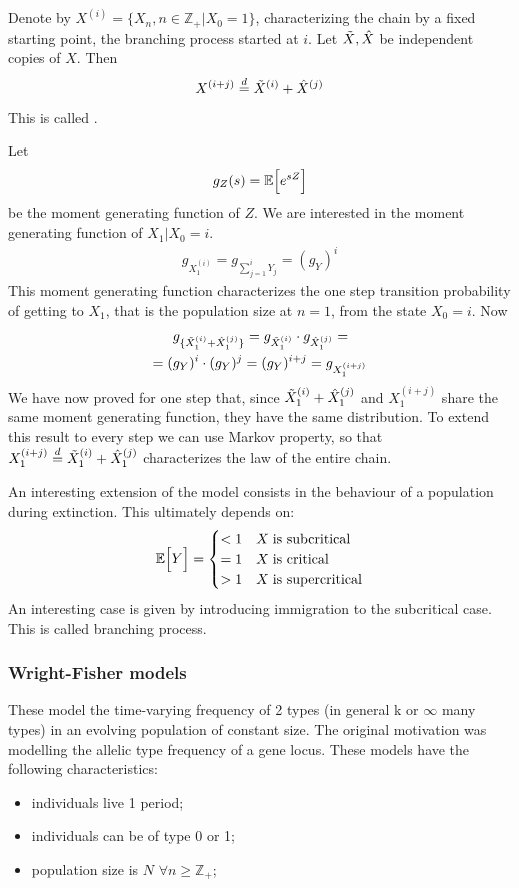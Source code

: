 \documentclass{article}
\begin{document}
\begin{proposition}{}
    Denote by $X^{(i)}=\{{X_n}, n \in \mathbb{Z}_+|X_0=1\}$, characterizing the chain by a fixed starting point, the branching process started at $i$. Let $\Tilde{X},\hat{X}$ be independent copies of $X$. Then
    \begin{equation}
        X^{(i+j)}\stackrel{d}{=}\Tilde{X}^{(i)}+\hat{X}^{(j)}
    \end{equation}
    This is called .
\end{proposition}
\begin{proof2}
    Let 
    \[
    g_{Z}(s)=\mathbb{E}\Bigl[{e^{sZ}}\Bigr]
    \]
    be the moment generating function of $Z$. We are interested in the moment generating function of $X_1|X_0=i$.
    \begin{align*}
       g_{X_1^{(i)}}=g_{\sum_{j=1}^{i}Y_j} =(g_Y)^i
    \end{align*} 
    This moment generating function characterizes the one step transition probability of getting to $X_1$, that is the population size at $n=1$, from the state $X_0=i$. Now
    \begin{align*}
         &g_{\{\Tilde{X}_1^{(i)}+\hat{X}_1^{(j)}\}}=g_{\Tilde{X}_1^{(i)}}\cdot g_{\hat{X}_1^{(j)}}=\\
         =(&g_Y)^i\cdot(g_Y)^j=(g_Y)^{i+j}=g_{X_1^{(i+j)}}
    \end{align*}
    We have now proved for one step that, since $\Tilde{X}_1^{(i)}+\hat{X}_1^{(j)}$ and $X_1^{(i+j)}$ share the same moment generating function, they have the same distribution. To extend this result to every step we can use Markov property, so that $X^{(i+j)}_1\stackrel{d}{=}\Tilde{X}^{(i)}_1+\hat{X}^{(j)}_1$ characterizes the law of the entire chain.
\end{proof2}
An interesting extension of the model consists in the behaviour of a population during extinction. This ultimately depends on:
\[
\mathbb{E}\Bigl[{Y}\Bigr]=\begin{cases}
    <1 & X\; \text{is subcritical}\\
    =1 & X\; \text{is critical}\\
    >1 & X\; \text{is supercritical}\\
\end{cases}
\]
An interesting case is given by introducing immigration to the subcritical case. This is called  branching process.
\subsubsection*{Wright-Fisher models}
These model the time-varying frequency of 2 types (in general k or $\infty$ many types) in an evolving population of constant size. The original motivation was modelling the allelic type frequency of a gene locus. These models have the following characteristics:
\begin{itemize}
    \item individuals live 1 period;
    \item individuals can be of type 0 or 1;
    \item population size is $N$ $\forall n \geqslant \mathbb{Z}_+$;
\end{itemize}
\end{document}
